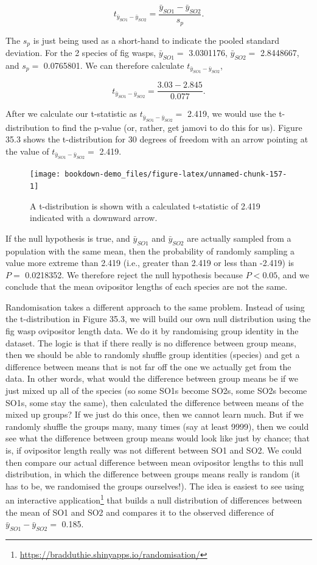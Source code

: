 \documentclass[
  openany]{scrbook}
\begin{document}
\[t_{\bar{y}_{SO1} - \bar{y}_{SO2}} = \frac{\bar{y}_{SO1} - \bar{y}_{SO2}}{s_{p}}.\]

The \(s_{p}\) is just being used as a short-hand to indicate the pooled standard deviation.
For the 2 species of fig wasps, \(\bar{y}_{SO1} =\) 3.0301176, \(\bar{y}_{SO2} =\) 2.8448667, and \(s_{p} =\) 0.0765801.
We can therefore calculate \(t_{\bar{y}_{SO1} - \bar{y}_{SO2}}\),

\[t_{\bar{y}_{SO1} - \bar{y}_{SO2}} = \frac{3.03 - 2.845}{0.077}.\]

After we calculate our t-statistic as \(t_{\bar{y}_{SO1} - \bar{y}_{SO2}} =\) 2.419, we would use the t-distribution to find the p-value (or, rather, get jamovi to do this for us).
Figure 35.3 shows the t-distribution for 30 degrees of freedom with an arrow pointing at the value of \(t_{\bar{y}_{SO1} - \bar{y}_{SO2}} =\) 2.419.

\begin{figure}
\texttt{[image: bookdown-demo\_files/figure-latex/unnamed-chunk-157-1]} \caption{A t-distribution is shown with a calculated t-statistic of 2.419 indicated with a downward arrow.}\label{fig:unnamed-chunk-157}
\end{figure}

If the null hypothesis is true, and \(\bar{y}_{SO1}\) and \(\bar{y}_{SO2}\) are actually sampled from a population with the same mean, then the probability of randomly sampling a value more extreme than 2.419 (i.e., greater than 2.419 or less than -2.419) is \(P =\) 0.0218352.
We therefore reject the null hypothesis because \(P < 0.05\), and we conclude that the mean ovipositor lengths of each species are not the same.

Randomisation takes a different approach to the same problem.
Instead of using the t-distribution in Figure 35.3, we will build our own null distribution using the fig wasp ovipositor length data.
We do it by randomising group identity in the dataset.
The logic is that if there really is no difference between group means, then we should be able to randomly shuffle group identities (species) and get a difference between means that is not far off the one we actually get from the data.
In other words, what would the difference between group means be if we just mixed up all of the species (so some SO1s become SO2s, some SO2s become SO1s, some stay the same), then calculated the difference between means of the mixed up groups?
If we just do this once, then we cannot learn much.
But if we randomly shuffle the groups many, many times (say at least 9999), then we could see what the difference between group means would look like just by chance; that is, if ovipositor length really was not different between SO1 and SO2.
We could then compare our actual difference between mean ovipositor lengths to this null distribution, in which the difference between groups means really is random (it has to be, we randomised the groups ourselves!).
The idea is easiest to see using an interactive application\footnote{\url{https://bradduthie.shinyapps.io/randomisation/}} that builds a null distribution of differences between the mean of SO1 and SO2 and compares it to the observed difference of \(\bar{y}_{SO1} - \bar{y}_{SO2} =\) 0.185.
\end{document}
